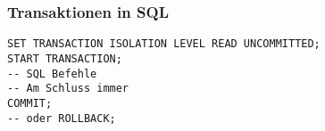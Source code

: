 \subsubsection{Transaktionen in SQL}

\begin{lstlisting}[caption={Transaktionen in SQL}]
SET TRANSACTION ISOLATION LEVEL READ UNCOMMITTED;
START TRANSACTION;
-- SQL Befehle
-- Am Schluss immer
COMMIT;
-- oder ROLLBACK;
\end{lstlisting}
